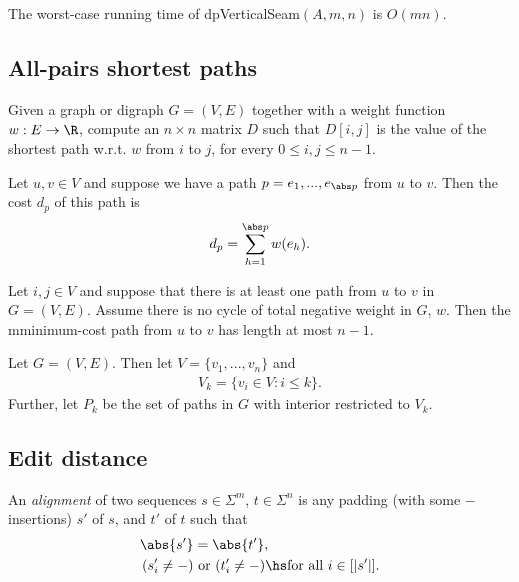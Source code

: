 \documentclass{article}
\begin{document}
\begin{corollary}[L17]
	The worst-case running time of \textsf{dpVerticalSeam}$(A,m,n)$ is $O(mn)$.
\end{corollary}

\subsection{All-pairs shortest paths}

\begin{definition}
	Given a graph or digraph $G=(V,E)$ together with a weight function
	$w:E\to\R$, compute an $n\times n$ matrix $D$ such that $D[i,j]$
	is the value of the shortest path w.r.t. $w$ from $i$ to $j$, for
	every $0\leq i,j\leq n-1$.	
\end{definition}

\begin{definition}[L18]
	Let $u,v\in V$ and suppose we have a path $p=e_1,...,e_{\abs p}$ from
	$u$ to $v$. Then the cost $d_p$ of this path is 
	\begin{align*}
		d_p = \sum_{h=1}^{\abs p} w(e_h).
	\end{align*}
\end{definition}

\begin{lemma}[L18]
	Let $i,j\in V$ and suppose that there is at least one path from $u$ to $v$
	in $G=(V,E)$. Assume there is no cycle of total negative weight in $G$, $w$.
	Then the mminimum-cost path from $u$ to $v$ has length at most $n-1$.
\end{lemma}

\begin{definition}[L18]
	Let $G=(V,E)$. Then let $V=\{v_1, ..., v_n\}$ and
	\begin{align*}
		V_k = \{v_i\in V : i\leq k\}.
	\end{align*}
	Further, let $P_k$ be the set of paths in $G$ with interior
	restricted to $V_k$.
\end{definition}

\subsection{Edit distance}

\begin{definition}
	An \emph{alignment} of two sequences $s\in\Sigma^m$, $t\in\Sigma^n$ is
	any padding (with some $-$ insertions) $s'$ of $s$, and $t'$ of $t$ such that
	\begin{align*}
		\abs{s'}&=\abs{t'},\\
		(s'_i\not=-)&\text{ or }(t'_i\not=-)\hs\text{for all }i\in[|s'|].
	\end{align*}
\end{definition}
\end{document}
